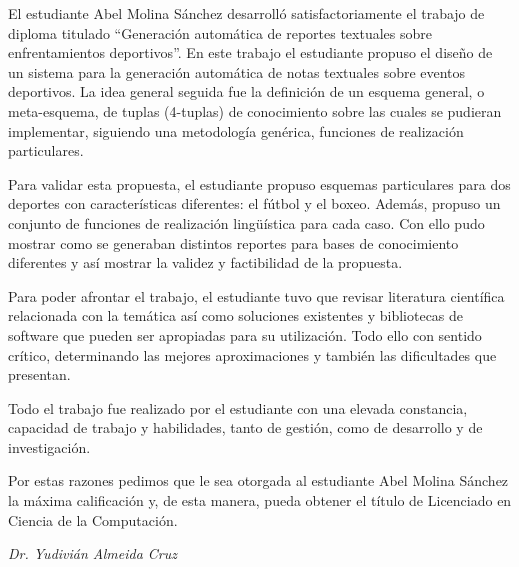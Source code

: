 \begin{opinion}
    
    El estudiante Abel Molina Sánchez desarrolló satisfactoriamente el trabajo de diploma 
titulado “Generación automática de reportes textuales sobre enfrentamientos deportivos”. En este 
trabajo el estudiante propuso el diseño de un sistema para la generación automática de notas 
textuales sobre eventos deportivos. La idea general seguida fue la definición de un esquema general, 
o meta-esquema, de tuplas (4-tuplas) de conocimiento sobre las cuales se pudieran implementar, 
siguiendo una metodología genérica, funciones de realización particulares. 
    
    Para validar esta propuesta, el estudiante propuso esquemas particulares para dos deportes con 
características diferentes: el fútbol y el boxeo. Además, propuso un conjunto de funciones de 
realización lingüística para cada caso. Con ello pudo mostrar como se generaban distintos reportes 
para bases de conocimiento diferentes y así mostrar la validez y factibilidad de la propuesta.
    
    Para poder afrontar el trabajo, el estudiante tuvo que revisar literatura científica relacionada 
con la temática así como soluciones existentes y bibliotecas de software que pueden ser apropiadas 
para su utilización. Todo ello con sentido crítico, determinando las mejores aproximaciones y también 
las dificultades que presentan.
    
    Todo el trabajo fue realizado por el estudiante con una elevada constancia, capacidad de trabajo y 
habilidades, tanto de gestión, como de desarrollo y de investigación. 
    
    Por estas razones pedimos que le sea otorgada al estudiante Abel Molina Sánchez la máxima calificación 
y, de esta manera, pueda obtener el título de Licenciado en Ciencia de la Computación.
    

\vspace{1cm}
\begin{flushright}
    \emph{Dr. Yudivián Almeida Cruz} \\
\end{flushright}   



\end{opinion}